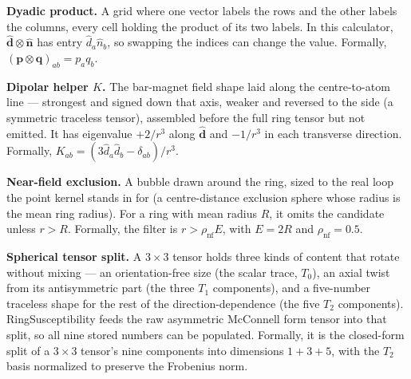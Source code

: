\documentclass[11pt]{article}
\begin{document}
\textbf{Dyadic product.} A grid where one vector labels the rows and the other
labels the columns, every cell holding the product of its two labels. In this
calculator,
\(\hat{\bm d}\otimes\hat{\bm n}\) has entry \(\hat d_a\hat n_b\), so swapping
the indices can change the value. Formally,
\((\bm p\otimes\bm q)_{ab}=p_aq_b\).

\textbf{Dipolar helper \(K\).} The bar-magnet field shape laid along the
centre-to-atom line --- strongest and signed down that axis, weaker and reversed
to the side (a symmetric traceless tensor), assembled before the full ring
tensor but not emitted.
It has eigenvalue \(+2/r^3\) along \(\hat{\bm d}\) and \(-1/r^3\) in each
transverse direction. Formally,
\(K_{ab}=(3\hat d_a\hat d_b-\delta_{ab})/r^3\).

\textbf{Near-field exclusion.} A bubble drawn around the ring, sized to the real
loop the point kernel stands in for (a centre-distance exclusion sphere whose
radius is the mean ring radius). For a ring with mean
radius \(R\), it omits the candidate unless \(r>R\). Formally, the filter is
\(r>\rho_{\mathrm{nf}}E\), with \(E=2R\) and
\(\rho_{\mathrm{nf}}=0.5\).

\textbf{Spherical tensor split.} A \(3\times3\) tensor holds three kinds of
content that rotate without mixing --- an orientation-free size (the scalar
trace, \(T_0\)), an axial twist from its antisymmetric part (the three \(T_1\)
components), and a five-number traceless shape for the rest of the
direction-dependence (the five \(T_2\) components).
RingSusceptibility feeds the raw
asymmetric McConnell form tensor into that split, so all nine stored numbers can
be populated. Formally, it is the closed-form split of a \(3\times3\) tensor's
nine components into dimensions \(1+3+5\), with the \(T_2\)
basis normalized to preserve the Frobenius norm.
\end{document}
